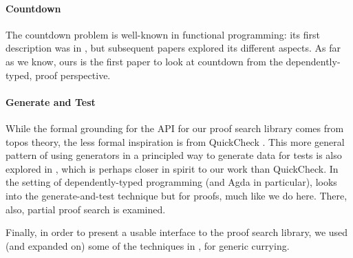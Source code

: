 \paragraph{Countdown}
The countdown problem is well-known in functional programming: its first
description was in \citet{huttonCountdownProblem2002}, but subsequent papers
\citep{birdCountdownCaseStudy2005, birdFunctionalPearlTrouble2003}
explored its different aspects.
As far as we know, ours is the first paper to look at countdown from the
dependently-typed, proof perspective.
\paragraph{Generate and Test}
While the formal grounding for the API for our proof search library comes from
topos theory, the less formal inspiration is from QuickCheck
\citep{claessenQuickCheckLightweightTool2011}.
This more general pattern of using generators in a principled way to generate
data for tests is also explored in \citet{runcimanSmallCheckLazySmallCheck2008},
which is perhaps closer in spirit to our work than QuickCheck.
In the setting of dependently-typed programming (and Agda in particular),
\citet{oconnorApplicationsApplicativeProof2016} looks into the generate-and-test
technique but for proofs, much like we do here.
There, also, partial proof search is examined.

Finally, in order to present a usable interface to the proof search library, we
used (and expanded on) some of the techniques in
\citet{allaisGenericLevelPolymorphic2019}, for generic currying.

